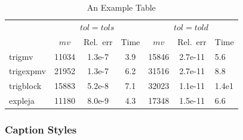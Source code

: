 \begin{table}
  \begin{center}
\caption{\label{tab:example} An Example Table}
\begin{tabular}{lcccccl}
  \toprule
& \multicolumn{3}{c}{$tol=tols$} & \multicolumn{3}{c}{$tol=told$}
\\\cmidrule(lr){2-4}
\cmidrule(lr){5-7}
           & $mv$  & Rel.~err & Time    & $mv$  & Rel.~err & Time\\
\midrule
trigmv    & 11034 & 1.3e-7 & 3.9 & 15846 & 2.7e-11 & 5.6 \\
trigexpmv & 21952 & 1.3e-7 & 6.2 & 31516 & 2.7e-11 & 8.8 \\
trigblock & 15883 & 5.2e-8 & 7.1 & 32023 & 1.1e-11 & 1.4e1\\
expleja   & 11180 & 8.0e-9 & 4.3 & 17348 & 1.5e-11 & 6.6 \\
\bottomrule
\end{tabular}
\end{center}
\end{table}

\subsubsection{Caption Styles}
\lipsum

